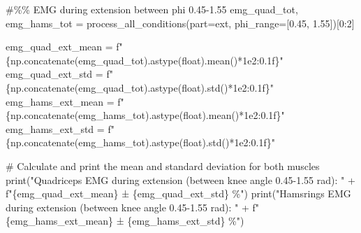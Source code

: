 \documentclass[
  11pt,
  a4paper]{article}
\newenvironment{Shaded}{\begin{snugshade}}{\end{snugshade}}
\newcommand{\BuiltInTok}[1]{\textcolor[rgb]{0.00,0.23,0.31}{#1}}
\newcommand{\CommentTok}[1]{\textcolor[rgb]{0.37,0.37,0.37}{#1}}
\newcommand{\DecValTok}[1]{\textcolor[rgb]{0.68,0.00,0.00}{#1}}
\newcommand{\FloatTok}[1]{\textcolor[rgb]{0.68,0.00,0.00}{#1}}
\newcommand{\NormalTok}[1]{\textcolor[rgb]{0.00,0.23,0.31}{#1}}
\newcommand{\OperatorTok}[1]{\textcolor[rgb]{0.37,0.37,0.37}{#1}}
\newcommand{\SpecialCharTok}[1]{\textcolor[rgb]{0.37,0.37,0.37}{#1}}
\newcommand{\SpecialStringTok}[1]{\textcolor[rgb]{0.13,0.47,0.30}{#1}}
\newcommand{\StringTok}[1]{\textcolor[rgb]{0.13,0.47,0.30}{#1}}
\begin{document}
\begin{Shaded}
\begin{Highlighting}[]
\CommentTok{\#\%\% EMG during extension between phi 0.45{-}1.55}
\NormalTok{emg\_quad\_tot, emg\_hams\_tot }\OperatorTok{=}\NormalTok{ process\_all\_conditions(part}\OperatorTok{=}\StringTok{\textquotesingle{}ext\textquotesingle{}}\NormalTok{, phi\_range}\OperatorTok{=}\NormalTok{[}\FloatTok{0.45}\NormalTok{, }\FloatTok{1.55}\NormalTok{])[}\DecValTok{0}\NormalTok{:}\DecValTok{2}\NormalTok{]}

\NormalTok{emg\_quad\_ext\_mean }\OperatorTok{=} \SpecialStringTok{f"}\SpecialCharTok{\{}\NormalTok{np}\SpecialCharTok{.}\NormalTok{concatenate(emg\_quad\_tot)}\SpecialCharTok{.}\NormalTok{astype(}\BuiltInTok{float}\NormalTok{)}\SpecialCharTok{.}\NormalTok{mean()}\OperatorTok{*}\FloatTok{1e2}\SpecialCharTok{:0.1f\}}\SpecialStringTok{"}
\NormalTok{emg\_quad\_ext\_std  }\OperatorTok{=} \SpecialStringTok{f"}\SpecialCharTok{\{}\NormalTok{np}\SpecialCharTok{.}\NormalTok{concatenate(emg\_quad\_tot)}\SpecialCharTok{.}\NormalTok{astype(}\BuiltInTok{float}\NormalTok{)}\SpecialCharTok{.}\NormalTok{std()}\OperatorTok{*}\FloatTok{1e2}\SpecialCharTok{:0.1f\}}\SpecialStringTok{"}
\NormalTok{emg\_hams\_ext\_mean }\OperatorTok{=} \SpecialStringTok{f"}\SpecialCharTok{\{}\NormalTok{np}\SpecialCharTok{.}\NormalTok{concatenate(emg\_hams\_tot)}\SpecialCharTok{.}\NormalTok{astype(}\BuiltInTok{float}\NormalTok{)}\SpecialCharTok{.}\NormalTok{mean()}\OperatorTok{*}\FloatTok{1e2}\SpecialCharTok{:0.1f\}}\SpecialStringTok{"}
\NormalTok{emg\_hams\_ext\_std  }\OperatorTok{=} \SpecialStringTok{f"}\SpecialCharTok{\{}\NormalTok{np}\SpecialCharTok{.}\NormalTok{concatenate(emg\_hams\_tot)}\SpecialCharTok{.}\NormalTok{astype(}\BuiltInTok{float}\NormalTok{)}\SpecialCharTok{.}\NormalTok{std()}\OperatorTok{*}\FloatTok{1e2}\SpecialCharTok{:0.1f\}}\SpecialStringTok{"}

\CommentTok{\# Calculate and print the mean and standard deviation for both muscles}
\BuiltInTok{print}\NormalTok{(}\StringTok{"Quadriceps EMG during extension (between knee angle 0.45{-}1.55 rad): "} \OperatorTok{+}
      \SpecialStringTok{f"}\SpecialCharTok{\{}\NormalTok{emg\_quad\_ext\_mean}\SpecialCharTok{\}}\SpecialStringTok{ ± }\SpecialCharTok{\{}\NormalTok{emg\_quad\_ext\_std}\SpecialCharTok{\}}\SpecialStringTok{ \%"}\NormalTok{)}
\BuiltInTok{print}\NormalTok{(}\StringTok{"Hamsrings EMG during extension (between knee angle 0.45{-}1.55 rad): "} \OperatorTok{+}
      \SpecialStringTok{f"}\SpecialCharTok{\{}\NormalTok{emg\_hams\_ext\_mean}\SpecialCharTok{\}}\SpecialStringTok{ ± }\SpecialCharTok{\{}\NormalTok{emg\_hams\_ext\_std}\SpecialCharTok{\}}\SpecialStringTok{ \%"}\NormalTok{)}


\end{Highlighting}
\end{Shaded}
\end{document}
